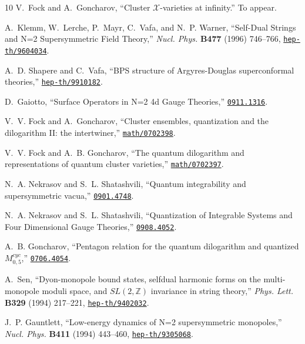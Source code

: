 \begin{thebibliography}{10}
V.~Fock and A.~Goncharov, ``{Cluster {$\mathcal X$}-varieties at infinity}.''
\newblock To appear.

A.~Klemm, W.~Lerche, P.~Mayr, C.~Vafa, and N.~P. Warner, ``{Self-Dual Strings
  and N=2 Supersymmetric Field Theory},'' {\em Nucl. Phys.} {\bf B477} (1996)
  746--766,
\href{http://www.arXiv.org/abs/hep-th/9604034}{{\tt hep-th/9604034}}.

A.~D. Shapere and C.~Vafa, ``{BPS structure of Argyres-Douglas superconformal
  theories},''
\href{http://www.arXiv.org/abs/hep-th/9910182}{{\tt hep-th/9910182}}.

D.~Gaiotto, ``{Surface Operators in N=2 4d Gauge Theories},''
\href{http://www.arXiv.org/abs/0911.1316}{{\tt 0911.1316}}.

V.~V. Fock and A.~Goncharov, ``{C}luster ensembles, quantization and the
  dilogarithm {II}: the intertwiner,''
  \href{http://www.arXiv.org/abs/math/0702398}{{\tt math/0702398}}.

V.~V. Fock and A.~B. Goncharov, ``{T}he quantum dilogarithm and representations
  of quantum cluster varieties,''
  \href{http://www.arXiv.org/abs/math/0702397}{{\tt math/0702397}}.

N.~A. Nekrasov and S.~L. Shatashvili, ``{Quantum integrability and
  supersymmetric vacua},''
\href{http://www.arXiv.org/abs/0901.4748}{{\tt 0901.4748}}.

N.~A. Nekrasov and S.~L. Shatashvili, ``{Quantization of Integrable Systems and
  Four Dimensional Gauge Theories},''
\href{http://www.arXiv.org/abs/0908.4052}{{\tt 0908.4052}}.

A.~B. Goncharov, ``{P}entagon relation for the quantum dilogarithm and
  quantized {${M}^{cyc}_{0,5}$},''
  \href{http://www.arXiv.org/abs/0706.4054}{{\tt 0706.4054}}.

A.~Sen, ``{Dyon-monopole bound states, selfdual harmonic forms on the
  multi-monopole moduli space, and {$SL(2,{\mathbb Z})$} invariance in string
  theory},'' {\em Phys. Lett.} {\bf B329} (1994) 217--221,
\href{http://www.arXiv.org/abs/hep-th/9402032}{{\tt hep-th/9402032}}.

J.~P. Gauntlett, ``{Low-energy dynamics of {\cal N}=2 supersymmetric
  monopoles},'' {\em Nucl. Phys.} {\bf B411} (1994) 443--460,
\href{http://www.arXiv.org/abs/hep-th/9305068}{{\tt hep-th/9305068}}.


\end{thebibliography}
